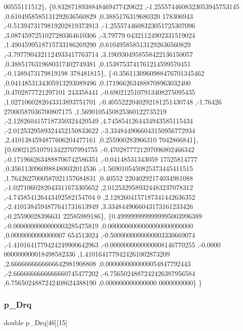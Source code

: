 \begin{DoxyCode}
      00555111512\},
\{0.8328718938848469477420622 ,-1.2555744608323053945753145 ,0.6104958585131292636560829 ,0.3885176319680320
      178306943 ,-0.5139473179819202819373913 ,-1.2555744608323051725307096 ,3.0874597251027280364610306 ,-3.79779
      04321124902331519024 ,1.4904599518715733186269290 ,0.6104958585131292636560829 ,-3.7977904321124933417763714
       ,3.1969304958558422136150057 ,0.3885176319680317402749381 ,0.1538753741761214599570451 ,-0.1389473179819198
      378481815\},
\{-0.3561130960988476701345462 ,0.0414853134305913293089496 ,0.1719662634888708963032400 ,0.4702877721297101
      243358441 ,-0.6902125107913408275095435 ,1.0271060282043313893751701 ,-0.4055222040292181251430748 ,-1.76426
      27000587036700807175 ,1.5690105450825360122735219 ,-2.1282604157187350324420549 ,4.7458541264434943585115434
       ,-2.0125329589324452150833622 ,-3.3348449066043150956772934 ,2.4101384594877606204477161 ,0.255900283966310
      7042866841\},
\{0.6902125107913422707994755 ,-0.4702877721297096802466342 ,-0.1719662634888706742586351 ,-0.04148531343059
      17525814777 ,0.3561130960988480032014536 ,-1.5690105450825373445411515 ,1.7642627000587021157684831 ,0.40552
      22040292174034981088 ,-1.0271060282043311673305652 ,2.0125329589324483237078312 ,-4.745854126443492582154704
      0 ,2.1282604157187341442636352 ,-2.4101384594877641731613949 ,3.3348449066043173161233426 ,-0.25590028396631
      22585989186\},
\{0.4999999999999995003996389 ,-0.0000000000000003285475819 ,0.0000000000000000000000000 ,0.0000000000000007
      654513024 ,-0.5000000000000003330669074 ,-1.4101641779424249900642963 ,-0.0000000000000008146770255 ,-0.0000
      000000000018498582336 ,1.4101641779424261002873209 ,2.6666666666666642981908808 ,0.0000000000000054847792443
       ,-2.6666666666666660745477202 ,-6.7565024887242426387956584 ,6.7565024887242408624388190 ,0.000000000000000
      0000000000\}
\}
\end{DoxyCode}
\mbox{\label{a00996_a96c135103bc114c43b728a3aecdb6df9}} 
\subsubsection{\texorpdfstring{p\+\_\+\+Drq}{p\_Drq}}
{\footnotesize\ttfamily double p\+\_\+\+Drq\mbox{[}46\mbox{]}\mbox{[}15\mbox{]}}

